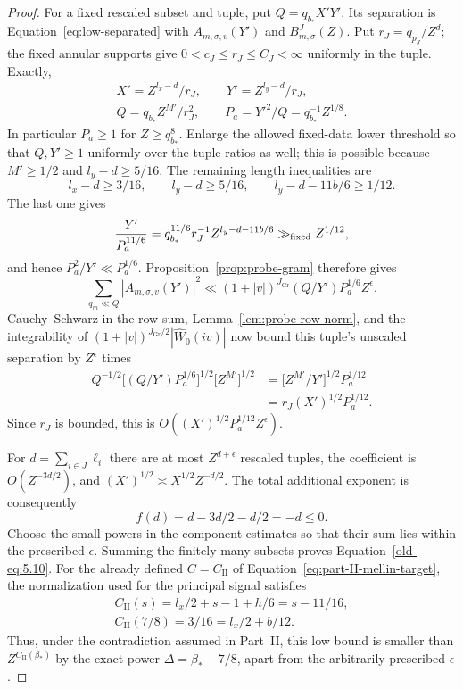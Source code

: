 \documentclass[11pt,a4paper]{article}
\numberwithin{equation}{section}
\numberwithin{figure}{section}
\theoremstyle{definition}
\theoremstyle{remark}
\begin{document}
\begin{proof}
For a fixed rescaled subset and tuple, put $Q=q_{b_*}X'Y'$.
Its separation is Equation~\eqref{eq:low-separated} with
$A_{m,\sigma,v}(Y')$ and $B^J_{m,\sigma}(Z)$.  Put
$r_J=q_{p_J}/Z^d$; the fixed annular supports give
$0<c_J\le r_J\le C_J<\infty$ uniformly in the tuple.  Exactly,
\[
 \begin{gathered}
 X'=Z^{l_x-d}/r_J,\qquad Y'=Z^{l_y-d}/r_J,\\
 Q=q_{b_*}Z^{M'}/r_J^2,\qquad
 P_a=Y'^2/Q=q_{b_*}^{-1}Z^{1/8}.
 \end{gathered}
\]
In particular $P_a\ge1$ for $Z\ge q_{b_*}^8$.  Enlarge the allowed
fixed-data lower threshold so that $Q,Y'\ge1$ uniformly over the
tuple ratios as well; this is possible because $M'\ge1/2$ and
$l_y-d\ge5/16$.  The remaining length inequalities are
\[
 l_x-d\ge3/16,\qquad l_y-d\ge5/16,
 \qquad l_y-d-11b/6\ge1/12.
\]
The last one gives
\[
 \frac{Y'}{P_a^{11/6}}
 =q_{b_*}^{11/6}r_J^{-1}Z^{l_y-d-11b/6}
       \gg_{\rm fixed}Z^{1/12},
\]
and hence $P_a^2/Y'\ll P_a^{1/6}$.  Proposition~\ref{prop:probe-gram}
therefore gives
\begin{equation}
 \sum_{q_m\ll Q}|A_{m,\sigma,v}(Y')|^2
 \ll (1+|v|)^{J_{\mathrm{Gr}}}(Q/Y')P_a^{1/6}Z^\epsilon.
 \label{old-eq:5.6}
\end{equation}
Cauchy--Schwarz in the row sum, Lemma~\ref{lem:probe-row-norm},
and the integrability of $(1+|v|)^{J_{\mathrm{Gr}}/2}|\widehat W_0(iv)|$ now
bound this tuple's unscaled separation by $Z^\epsilon$ times
\[
 \begin{aligned}
 Q^{-1/2}\bigl[(Q/Y')P_a^{1/6}\bigr]^{1/2}
       \bigl[Z^{M'}\bigr]^{1/2}
 &=\bigl[Z^{M'}/Y'\bigr]^{1/2}P_a^{1/12}\\
 &=r_J(X')^{1/2}P_a^{1/12}.
 \end{aligned}
\]
Since $r_J$ is bounded, this is
$O((X')^{1/2}P_a^{1/12}Z^\epsilon)$.

For $d=\sum_{i\in J}\ell_i$ there are at most $Z^{d+\epsilon}$
rescaled tuples, the coefficient is $O(Z^{-3d/2})$, and
$(X')^{1/2}\asymp X^{1/2}Z^{-d/2}$.  The total additional exponent
is consequently
\begin{equation}
 f(d)=d-3d/2-d/2=-d\le0.
 \label{old-eq:5.5}
\end{equation}
Choose the small powers in the component estimates so that their sum lies
within the prescribed $\epsilon$.  Summing the finitely many subsets proves
Equation~\eqref{old-eq:5.10}.  For the already defined
$C=C_{\mathrm{II}}$ of Equation~\eqref{eq:part-II-mellin-target}, the
normalization used for the principal signal satisfies
\begin{equation}
 \begin{gathered}
 C_{\mathrm{II}}(s)=l_x/2+s-1+h/6=s-11/16,\\
 C_{\mathrm{II}}(7/8)=3/16=l_x/2+b/12.
 \end{gathered}
 \label{old-eq:5.11}
\end{equation}
Thus, under the contradiction assumed in Part~II, this low bound is smaller
than $Z^{C_{\mathrm{II}}(\beta_*)}$ by the exact power
$\Delta=\beta_*-7/8$, apart from the arbitrarily prescribed $\epsilon$.
\end{proof}
\end{document}
